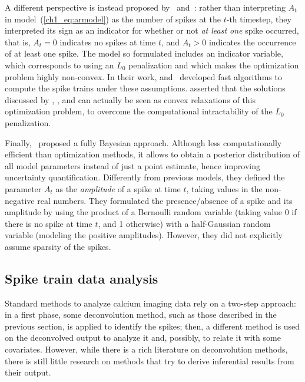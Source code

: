 A different perspective is instead proposed by~\citet{jewell2018} and~\citet{jewell2019}: rather than interpreting $A_t$ in model~(\ref{ch1_eq:armodel}) as the number of spikes at the $t$-th timestep, they interpreted its sign as an indicator for whether or not \textit{at least one} spike occurred, that is, $A_t = 0$ indicates no spikes at time $t$, and $A_t>0$ indicates the occurrence of at least one spike. The model so formulated includes an indicator variable, which corresponds to using an $L_0$ penalization and which makes the optimization problem highly non-convex. 
In their work, \citet{jewell2018} and~\citet{jewell2019} developed fast algorithms to compute the spike trains under these assumptions.
\citet{jewell2018} asserted that the solutions discussed by \citet{vogelstein2010}, \citet{friedrich2016}, and \citet{friedrich2017} can actually be seen as convex relaxations of this optimization problem, to overcome the computational intractability of the $L_0$ penalization. 

Finally,~\citet{pnevmatikakis2013} proposed a fully Bayesian approach. Although less computationally efficient than optimization methods, it allows to obtain a posterior distribution of all model parameters instead of just a point estimate, hence improving uncertainty quantification.
Differently from previous models, they defined the parameter $A_t$ as the \textit{amplitude} of a spike at time $t$, taking values in the non-negative real numbers.
They formulated the presence/absence of a spike and its amplitude by using the product of a Bernoulli random variable (taking value 0 if there is no spike at time $t$, and 1 otherwise) with a half-Gaussian random variable (modeling the positive amplitudes). However, they did not explicitly assume sparsity of the spikes.


\subsection{Spike train data analysis}
\label{ch1_sec:spike_train_analysis}
Standard methods to analyze calcium imaging data rely on a two-step approach: in a first phase, some deconvolution method, such as those described in the previous section, is applied to identify the spikes; then, a different method is used on the deconvolved output to analyze it and, possibly, to relate it with some covariates.
However, while there is a rich literature on deconvolution methods, there is still little research on methods that try to derive inferential results from their output.

